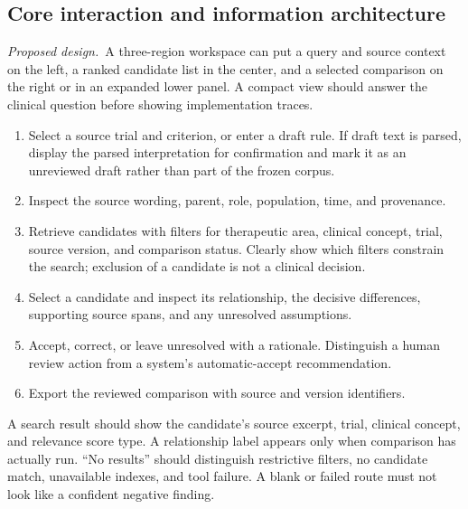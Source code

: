 \documentclass[10pt,letterpaper]{article}
\newcommand{\planned}{\textit{Proposed design.}}
\begin{document}
\subsection{Core interaction and information architecture}
\planned\ A three-region workspace can put a query and source context on the
left, a ranked candidate list in the center, and a selected comparison on the
right or in an expanded lower panel. A compact view should answer the clinical
question before showing implementation traces.
\begin{enumerate}
\item Select a source trial and criterion, or enter a draft rule. If draft text
is parsed, display the parsed interpretation for confirmation and mark it as
an unreviewed draft rather than part of the frozen corpus.
\item Inspect the source wording, parent, role, population, time, and provenance.
\item Retrieve candidates with filters for therapeutic area, clinical concept,
trial, source version, and comparison status. Clearly show which filters
constrain the search; exclusion of a candidate is not a clinical decision.
\item Select a candidate and inspect its relationship, the decisive
differences, supporting source spans, and any unresolved assumptions.
\item Accept, correct, or leave unresolved with a rationale. Distinguish a
human review action from a system's automatic-accept recommendation.
\item Export the reviewed comparison with source and version identifiers.
\end{enumerate}

A search result should show the candidate's source excerpt, trial, clinical
concept, and relevance score type. A relationship label appears only when
comparison has actually run. ``No results'' should distinguish restrictive
filters, no candidate match, unavailable indexes, and tool failure. A blank or
failed route must not look like a confident negative finding.
\end{document}
